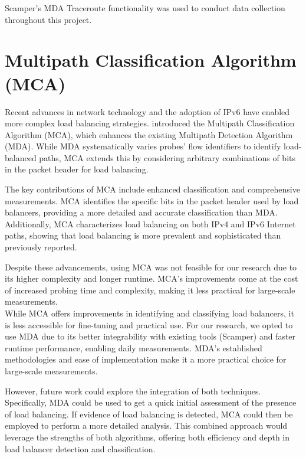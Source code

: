 \documentclass[12pt]{cwru_thesis}
\begin{document}
Scamper's MDA Traceroute functionality was used to conduct data collection throughout this project.

\section{Multipath Classification Algorithm (MCA)}

Recent advances in network technology and the adoption of IPv6 have enabled more complex load balancing strategies.  \cite{9155387} introduced the Multipath Classification Algorithm (MCA), which enhances the existing Multipath Detection Algorithm (MDA). While MDA systematically varies probes' flow identifiers to identify load-balanced paths, MCA extends this by considering arbitrary combinations of bits in the packet header for load balancing.

The key contributions of MCA include enhanced classification and comprehensive measurements. MCA identifies the specific bits in the packet header used by load balancers, providing a more detailed and accurate classification than MDA. Additionally, MCA characterizes load balancing on both IPv4 and IPv6 Internet paths, showing that load balancing is more prevalent and sophisticated than previously reported.


Despite these advancements, using MCA was not feasible for our research due to its higher complexity and longer runtime. MCA's improvements come at the cost of increased probing time and complexity, making it less practical for large-scale measurements.\\


While MCA offers improvements in identifying and classifying load balancers, it is less accessible for fine-tuning and practical use. For our research, we opted to use MDA due to its better integrability with existing tools (Scamper) and faster runtime performance, enabling daily measurements. MDA's established methodologies and ease of implementation make it a more practical choice for large-scale measurements. 

However, future work could explore the integration of both techniques. Specifically, MDA could be used to get a quick initial assessment of the presence of load balancing. If evidence of load balancing is detected, MCA could then be employed to perform a more detailed analysis. This combined approach would leverage the strengths of both algorithms, offering both efficiency and depth in load balancer detection and classification.
\end{document}
